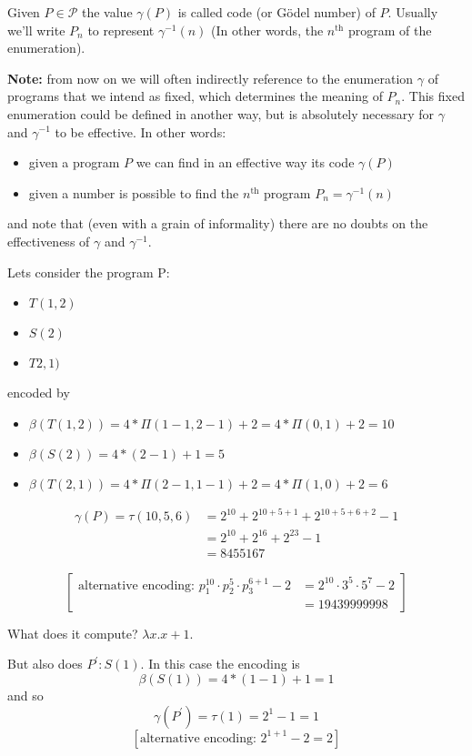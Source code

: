 \begin{definition}
  Given $P \in \mathcal{P}$ the value $\gamma(P)$ is called code (or
  Gödel number) of $P$. Usually we'll write $P_n$ to represent
  $\gamma^{-1}(n)$ (In other words, the $n^{\mbox{th}}$ program of the
  enumeration).
\end{definition}

\textbf{Note:} from now on we will often indirectly reference to the
enumeration $\gamma$ of programs that we intend as fixed, which
determines the meaning of $P_n$. This fixed enumeration could be
defined in another way, but is absolutely necessary for $\gamma$ and
$\gamma^{-1}$ to be effective. In other words:
\begin{itemize}
\item given a program $P$ we can find in an effective way its code
  $\gamma(P)$
\item given a number is possible to find the $n^{\mbox{th}}$ program
  $P_n = \gamma^{-1}(n)$
\end{itemize}

and note that (even with a grain of informality) there are no doubts
on the effectiveness of $\gamma$ and $\gamma^{-1}$.

\begin{example}
  Lets consider the program P:
  \begin{itemize}
  \item[] $T(1,2)$
  \item[] $S(2)$
  \item[] $T2,1)$
  \end{itemize}
  encoded by

  \begin{itemize}
  \item[] $\beta(T(1,2)) = 4 * \Pi(1-1,2-1) + 2 = 4 * \Pi(0,1) + 2 = 10$
  \item[] $\beta(S(2)) = 4 * (2-1) + 1 = 5$
  \item[] $\beta(T(2,1)) = 4 * \Pi(2-1,1-1) + 2 = 4 * \Pi(1,0) + 2 = 6$
  \end{itemize}

  \[\begin{split}
      \gamma(P) = \tau(10,5,6) & = 2^{10} + 2^{10+5+1} + 2^{10+5+6+2} - 1 \\
      & = 2^{10} + 2^{16} + 2^{23} - 1 \\
      & = 8455167
    \end{split}
  \]

  \[
    \left[
      \begin{split}
        \mbox{alternative encoding: } p_1^{10} \cdot p_2^5 \cdot p_3^{6+1} - 2 & = 2^{10} \cdot 3^5 \cdot 5^7 -2 \\
        & = 19439999998
      \end{split}
    \right]
  \]

  What does it compute? $\lambda x . x+1$.

  But also does $P^\prime : S(1)$. In this case the encoding is
  \[\beta(S(1)) = 4 * (1-1) + 1 = 1\] and so
  \[\gamma(P^\prime) = \tau(1) = 2^1 - 1 = 1\]
  \[\left[ \mbox{alternative encoding: } 2^{1+1} - 2 = 2 \right] \]
\end{example}

